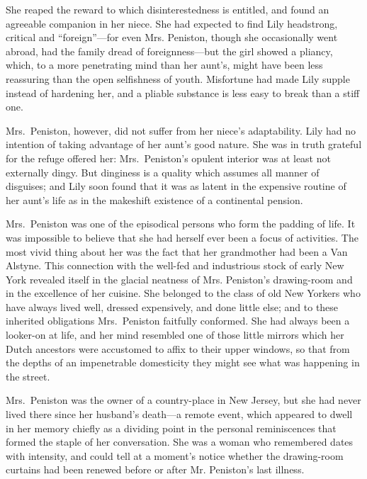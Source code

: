 \documentclass[12pt,a4paper]{book}
\begin{document}
She reaped the reward to which disinterestedness is entitled, and
found an agreeable companion in her niece. She had expected to
find Lily headstrong, critical and ``foreign''---for even Mrs.
Peniston, though she occasionally went abroad, had the family
dread of foreignness---but the girl showed a pliancy, which, to a
more penetrating mind than her aunt's, might have been less
reassuring than the open selfishness of youth. Misfortune had
made Lily supple instead of hardening her, and a pliable
substance is less easy to break than a stiff one.





Mrs.\ Peniston, however, did not suffer from her niece's
adaptability. Lily had no intention of taking advantage of her
aunt's good nature. She was in truth grateful for the refuge
offered her: Mrs.\ Peniston's opulent interior was at least not
externally dingy. But dinginess is a quality which assumes all
manner of disguises; and Lily soon found that it was as latent in
the expensive routine of her aunt's life as in the makeshift
existence of a continental pension.





Mrs.\ Peniston was one of the episodical persons who form the
padding of life. It was impossible to believe that she had
herself ever been a focus of activities. The most vivid thing
about her was the fact that her grandmother had been a Van
Alstyne. This connection with the well-fed and industrious stock
of early New York revealed itself in the glacial neatness of Mrs.
Peniston's drawing-room and in the excellence of her cuisine. She
belonged to the class of old New Yorkers who have always lived
well, dressed expensively, and done little else; and to these
inherited obligations Mrs.\ Peniston faitfully conformed. 
She had always been a looker-on at life, and her mind resembled
one of those little mirrors which her Dutch ancestors were
accustomed to affix to their upper windows, so that from the
depths of an impenetrable domesticity they might see what was
happening in the street.





Mrs.\ Peniston was the owner of a country-place in New Jersey, but
she had never lived there since her husband's death---a remote
event, which appeared to dwell in her memory chiefly as a
dividing point in the personal reminiscences that formed the
staple of her conversation. She was a woman who remembered dates
with intensity, and could tell at a moment's notice whether the
drawing-room curtains had been renewed before or after Mr.
Peniston's last illness.
\end{document}
